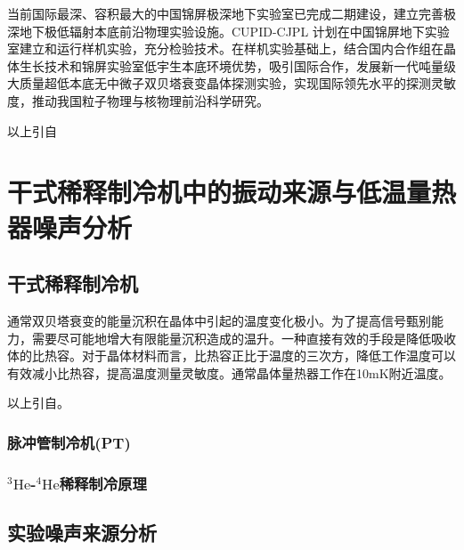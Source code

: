 \documentclass[type=master]{fduthesis}
\begin{document}
当前国际最深、容积最大的中国锦屏极深地下实验室已完成二期建设，建立完善极深地下极低辐射本底前沿物理实验设施。CUPID-CJPL 计划在中国锦屏地下实验室建立和运行样机实验，充分检验技术。在样机实验基础上，结合国内合作组在晶体生长技术和锦屏实验室低宇生本底环境优势，吸引国际合作，发展新一代吨量级大质量超低本底无中微子双贝塔衰变晶体探测实验，实现国际领先水平的探测灵敏度，推动我国粒子物理与核物理前沿科学研究。

{\color{blue} 以上引自}\cite{Cao2025Jinping} 
















\chapter{干式稀释制冷机中的振动来源与低温量热器噪声分析}






\section{干式稀释制冷机}
通常双贝塔衰变的能量沉积在晶体中引起的温度变化极小。为了提高信号甄别能力，需要尽可能地增大有限能量沉积造成的温升。一种直接有效的手段是降低吸收体的比热容。对于晶体材料而言，比热容正比于温度的三次方，降低工作温度可以有效减小比热容，提高温度测量灵敏度。通常晶体量热器工作在10mK附近温度。

{\color{green} 以上引自}\cite{Ma2020Majorana}。



\subsection{脉冲管制冷机(PT)}
\subsection{$^{3}\mathrm{He}$-$^{4}\mathrm{He}$稀释制冷原理}

\section{实验噪声来源分析}
\end{document}
